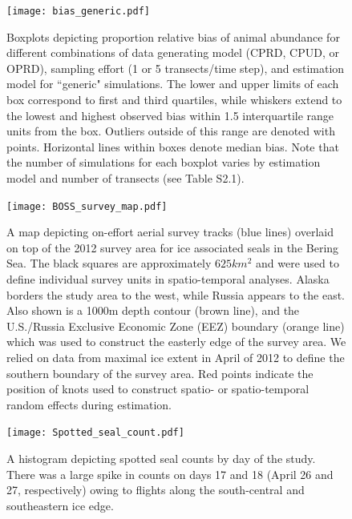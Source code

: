 \documentclass[times,mee,doublespace,]{besauth2}
\begin{document}
\begin{figure}
\begin{center}
\texttt{[image: bias\_generic.pdf]}
\caption{Boxplots depicting proportion relative bias of animal abundance for different combinations of data generating model (CPRD, CPUD, or OPRD), sampling effort (1 or 5 transects/time step), and estimation model for ``generic" simulations.  The lower and upper limits of each box correspond to first and third quartiles, while whiskers extend to the lowest and highest observed bias within 1.5 interquartile range units from the box.  Outliers outside of this range are denoted with points.  Horizontal lines within boxes denote median bias.  Note that the number of simulations for each boxplot varies by estimation model and number of transects (see Table S2.1).
}
\label{fig:bias_generic}
\end{center}
\end{figure}

\begin{figure}
\begin{center}
\texttt{[image: BOSS\_survey\_map.pdf]}
\caption{A map depicting on-effort aerial survey tracks (blue lines) overlaid on top of the 2012 survey area for ice associated seals in the Bering Sea.  The black squares are approximately $625km^2$ and were used to define individual survey units in spatio-temporal analyses.  Alaska borders the study area to the west, while Russia appears to the east.  Also shown is a 1000m depth contour (brown line), and the U.S./Russia Exclusive Economic Zone (EEZ) boundary (orange line) which was used to construct the easterly edge of the survey area.  We relied on data from maximal ice extent in April of 2012 to define the southern boundary of the survey area.  Red points indicate the position of knots used to construct spatio- or spatio-temporal random effects during estimation.
}
\label{fig:BOSS_effort}
\end{center}
\end{figure}

\begin{figure}
\begin{center}
\texttt{[image: Spotted\_seal\_count.pdf]}
\caption{A histogram depicting spotted seal counts by day of the study.  There was a large spike in counts on days 17 and 18 (April 26 and 27, respectively) owing to flights along the south-central and southeastern ice edge.
}
\label{fig:spotted_counts}
\end{center}
\end{figure}
\end{document}
